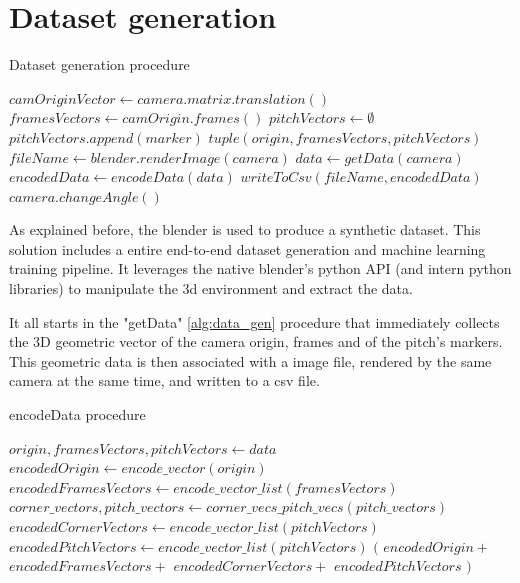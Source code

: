 \documentclass[
    11pt,
    oneside
]{report}
\begin{document}
\section{Dataset generation}


\begin{algorithm}[H]
\begin{algorithmic}
\caption{Dataset generation procedure}\label{alg:data_gen}
    \State $camOriginVector \gets camera.matrix.translation()$
    \State $framesVectors \gets camOrigin.frames()$
    \State $pitchVectors \gets \emptyset$
        \State $pitchVectors.append(marker)$
    \EndFor
    \State
    \Return $tuple(origin, framesVectors, pitchVectors)$
\EndProcedure
{}
    \State $fileName \gets blender.renderImage(camera)$
    \State $data \gets getData(camera)$
    \State $encodedData \gets encodeData(data)$
    \State $writeToCsv(fileName, encodedData)$
    \State $camera.changeAngle()$
\EndFor
\end{algorithmic}
\end{algorithm}


As explained before, the blender is used to produce a synthetic dataset. This solution includes a entire end-to-end dataset generation and machine learning training pipeline. It leverages the native blender's python API (and intern python libraries) to manipulate the 3d environment and extract the data.

It all starts in the "getData" \ref{alg:data_gen} procedure that immediately collects the 3D geometric vector of the camera origin, frames and of the pitch's markers. This geometric data is then associated with a image file, rendered by the same camera at the same time, and written to a csv file.



\begin{algorithm}[H]
\begin{algorithmic}
\caption{encodeData procedure}\label{alg:enc_data}
    \State $origin, framesVectors, pitchVectors \gets data$
    \State $encodedOrigin \gets encode\_vector(origin)$
    \State $encodedFramesVectors \gets encode\_vector\_list(framesVectors)$
    \State $corner\_vectors, pitch\_vectors \gets corner\_vecs\_pitch\_vecs(pitch\_vectors)$
    \State $encodedCornerVectors \gets encode\_vector\_list(pitchVectors)$
    \State $encodedPitchVectors \gets encode\_vector\_list(pitchVectors)$
    \State
    \Return $($
        \State \indent $encodedOrigin +$
        \State \indent $encodedFramesVectors +$
        \State \indent $encodedCornerVectors +$
        \State \indent $encodedPitchVectors$
    \State $)$
\EndProcedure
\end{algorithmic}
\end{algorithm}
\end{document}
